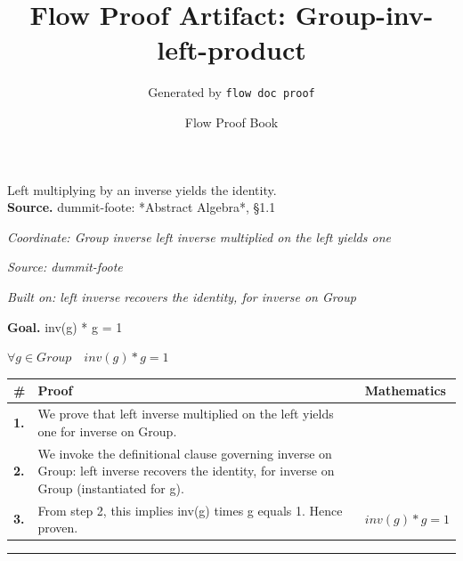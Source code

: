 \documentclass[11pt]{article}
\title{Flow Proof Artifact: Group-inv-left-product}
\author{Generated by \texttt{flow doc proof}}
\date{Flow Proof Book}
\theoremstyle{definition}
\begin{document}
\maketitle
Left multiplying by an inverse yields the identity.\\[0.5em]
\textbf{Source.} dummit-foote: *Abstract Algebra*, §1.1\\[0.5em]
\bigskip
{}\par
\smallskip\noindent\textit{Coordinate: Group \cdot inverse \cdot left inverse multiplied on the left yields one}\par
\smallskip\noindent\textit{Source: dummit-foote}\par
\smallskip\noindent\textit{Built on: left inverse recovers the identity, for inverse on Group}\par
\medskip
\noindent\textbf{Goal.} inv(g) * g = 1\par
\noindent$\displaystyle \forall g \in Group\quad inv(g) * g = 1$\par
\medskip
\noindent
\begin{tabular}{@{} >{\raggedright\arraybackslash}p{} >{\raggedright\arraybackslash}p{} >{\raggedleft\arraybackslash}p{} @{}}
\textbf{\#} & \textbf{Proof} & \textbf{Mathematics} \\
\midrule
\textbf{1.} & We prove that left inverse multiplied on the left yields one for inverse on Group. & \\[0.45em]
\textbf{2.} & We invoke the definitional clause governing inverse on Group: left inverse recovers the identity, for inverse on Group (instantiated for g). & \\[0.45em]
\textbf{3.} & From step 2, this implies inv(g) times g equals 1. Hence proven. & $\displaystyle inv(g) * g = 1$ \\[0.45em]
\bottomrule
\end{tabular}
\label{thm:Group-inverse-left_inverse_multiplied_on_the_left_yields_one}
\par\medskip\hrule
\end{document}
